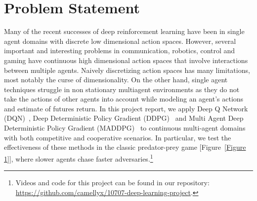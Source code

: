 
\section{Problem Statement}
\label{sec:problem}

Many of the recent successes of deep reinforcement learning have been in single agent domains with discrete low dimensional action spaces. However, several important and interesting problems in communication, robotics, control and gaming have continuous high dimensional action spaces that involve interactions between multiple agents. Naively discretizing action spaces has many limitations, most notably the curse of dimensionality. On the other hand, single agent techniques struggle in non stationary multiagent environments as they do not take the actions of other agents into account while modeling an agent's actions and estimate of futures return. In this project report, we apply Deep Q Network (DQN)~\cite{mnih2016dqn}, Deep Deterministic Policy Gradient (DDPG)~\cite{lillicrap2016continuous} and Multi Agent Deep Deterministic Policy Gradient (MADDPG)~\cite{lowe2017multi} to continuous multi-agent domains with both competitive and cooperative scenarios. In particular, we test the effectiveness of these methods in the classic predator-prey game [Figure~\ref{Figure 1}], where slower agents chase faster adversaries.\footnote{Videos and code for this project can be found in our repository: \url{https://github.com/camellyx/10707-deep-learning-project}.}
 
